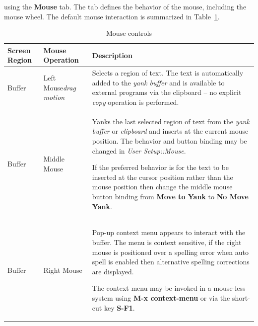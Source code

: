 \documentclass[11pt,a4paper,pdftex]{article}
\begin{document}
  using the \textbf{Mouse} tab. The tab defines the behavior of the mouse,
  including the mouse wheel. The default mouse interaction is summarized in
  Table~\ref{tab:mousecontrols}.

  \begin{center}
    \begin{small}
      \begin{longtable}{|p{}|p{}|p{}|}
          \hline
          \textbf{Screen Region} & \textbf{Mouse Operation} &
          \textbf{Description}\\
          \hline
        \endhead
          \hline
          \caption {Mouse controls (continued $\ldots$)}
        \endfoot
          \hline
          \caption {Mouse controls}
          \label{tab:mousecontrols}
        \endlastfoot

        Buffer & Left Mouse\newline \textit{drag motion} &

        Selects a region of text. The text is automatically added to the
        \textit{yank buffer} and is available to external programs via the
        clipboard -- no explicit \textit{copy} operation is performed. \\
        \hline

        Buffer & Middle Mouse &

        Yanks the last selected region of text from the \textit{yank buffer}
        or \textit{clipboard} and inserts at the current mouse position. The
        behavior and button binding may be changed in \textit{User
        Setup::\-Mouse}.

        If the preferred behavior is for the text to be inserted at the cursor
        position rather than the mouse position then change the middle mouse
        button binding from \textbf{Move to Yank} to \textbf{No Move Yank}.\\
        \hline

        Buffer & Right Mouse &

        Pop-up context menu appears to interact with the buffer. The menu is
        context sensitive, if the right mouse is positioned over a spelling
        error when auto spell is enabled then alternative spelling corrections
        are displayed.

        The context menu may be invoked in a mouse-less system using
        \textbf{M-x context-menu} or via the short-cut key \textbf{S-F1}.\\
        \hline


\end{longtable}
\end{small}
\end{center}
\end{document}
